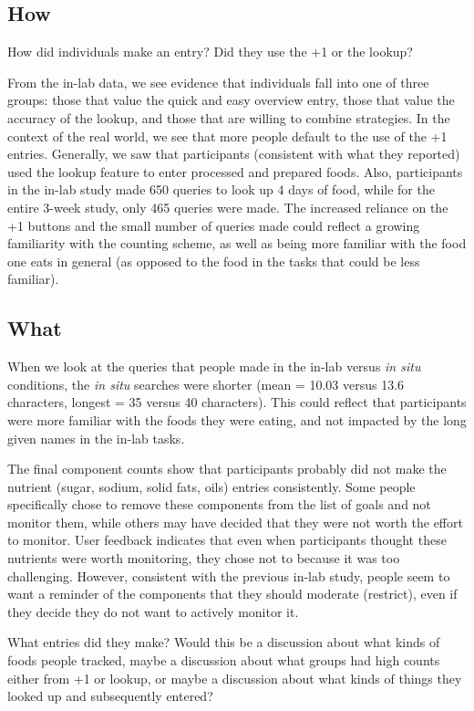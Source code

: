 \subsection{How}

How did individuals make an entry? Did they use the +1 or the lookup?

From the in-lab data, we see evidence that individuals fall into one of three groups: those that value the quick and easy overview entry, those that value the accuracy of the lookup, and those that are willing to combine strategies. In the context of the real world, we see that more people default to the use of the +1 entries. Generally, we saw that participants (consistent with what they reported) used the lookup feature to enter processed and prepared foods. Also, participants in the in-lab study made 650 queries to look up 4 days of food, while for the entire 3-week study, only 465 queries were made. The increased reliance on the +1 buttons and the small number of queries made could reflect a growing familiarity with the counting scheme, as well as being more familiar with the food one eats in general (as opposed to the food in the tasks that could be less familiar). 

\subsection{What}

When we look at the queries that people made in the in-lab versus \textit{in situ} conditions, the \textit{in situ} searches were shorter (mean = 10.03 versus 13.6 characters, longest = 35 versus 40 characters). This could reflect that participants were more familiar with the foods they were eating, and not impacted by the long given names in the in-lab tasks. 

The final component counts show that participants probably did not make the nutrient (sugar, sodium, solid fats, oils) entries consistently. Some people specifically chose to remove these components from the list of goals and not monitor them, while others may have decided that they were not worth the effort to monitor. User feedback indicates that even when participants thought these nutrients were worth monitoring, they chose not to because it was too challenging. However, consistent with the previous in-lab study, people seem to want a reminder of the components that they should moderate (restrict), even if they decide they do not want to actively monitor it. 

What entries did they make? Would this be a discussion about what kinds of foods people tracked, maybe a discussion about what groups had high counts either from +1 or lookup, or maybe a discussion about what kinds of things they looked up and subsequently entered? 

